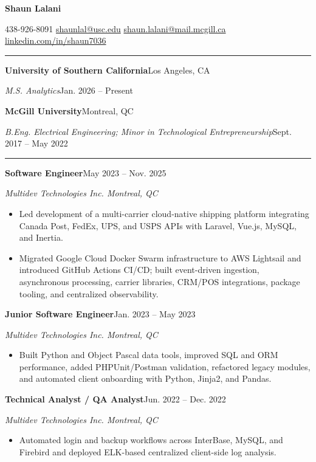 \documentclass[10pt,letterpaper]{article}
\newcommand{\resumesection}[1]{\vspace{5pt}{\large\scshape #1}\par\hrule\vspace{3pt}}
\begin{document}
{\Huge\bfseries Shaun Lalani}\hfill\par
438-926-8091 \enspace\textbar\enspace
\href{mailto:shaunlal@usc.edu}{shaunlal@usc.edu} \enspace\textbar\enspace
\href{mailto:shaun.lalani@mail.mcgill.ca}{shaun.lalani@mail.mcgill.ca} \enspace\textbar\enspace
\href{https://www.linkedin.com/in/shaun7036/}{linkedin.com/in/shaun7036}

\resumesection{Education}
\textbf{University of Southern California}\hfill Los Angeles, CA\par
\textit{M.S. Analytics}\hfill Jan. 2026 -- Present\par
\textbf{McGill University}\hfill Montreal, QC\par
\textit{B.Eng. Electrical Engineering; Minor in Technological Entrepreneurship}\hfill Sept. 2017 -- May 2022

\resumesection{Experience}
\textbf{Software Engineer}\hfill May 2023 -- Nov. 2025\par
\textit{Multidev Technologies Inc. \enspace\textbar\enspace Montreal, QC}
\begin{itemize}
\item Led development of a multi-carrier cloud-native shipping platform integrating Canada Post, FedEx, UPS, and USPS APIs with Laravel, Vue.js, MySQL, and Inertia.
\item Migrated Google Cloud Docker Swarm infrastructure to AWS Lightsail and introduced GitHub Actions CI/CD; built event-driven ingestion, asynchronous processing, carrier libraries, CRM/POS integrations, package tooling, and centralized observability.
\end{itemize}
\textbf{Junior Software Engineer}\hfill Jan. 2023 -- May 2023\par
\textit{Multidev Technologies Inc. \enspace\textbar\enspace Montreal, QC}
\begin{itemize}
\item Built Python and Object Pascal data tools, improved SQL and ORM performance, added PHPUnit/Postman validation, refactored legacy modules, and automated client onboarding with Python, Jinja2, and Pandas.
\end{itemize}
\textbf{Technical Analyst / QA Analyst}\hfill Jun. 2022 -- Dec. 2022\par
\textit{Multidev Technologies Inc. \enspace\textbar\enspace Montreal, QC}
\begin{itemize}
\item Automated login and backup workflows across InterBase, MySQL, and Firebird and deployed ELK-based centralized client-side log analysis.
\end{itemize}
\end{document}

